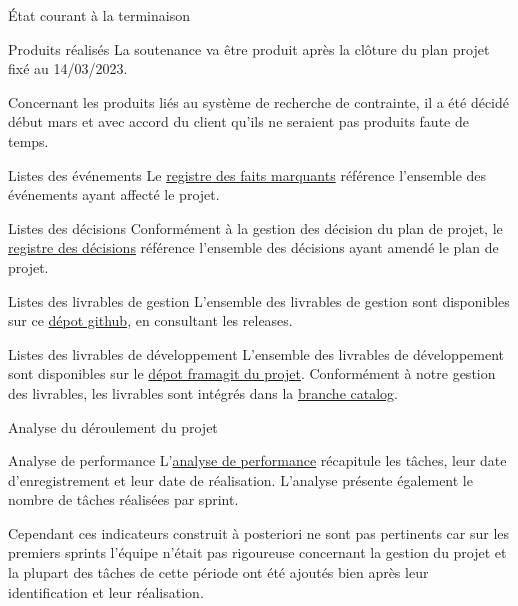\documentclass[]{article}
\begin{document}
{\begin{section}{État courant à la terminaison}
\begin{subsection}{Produits réalisés}
     La soutenance va être produit après la clôture du plan projet fixé au 14/03/2023.

     Concernant les produits liés au système de recherche de contrainte, il a été décidé début mars et avec accord du client qu’ils ne seraient pas produits faute de temps.
 \end{subsection}

 \begin{subsection}{Listes des événements}
     Le \href{Registre_des_faits_marquants.pdf}{registre des faits marquants} référence l'ensemble des événements ayant affecté le projet.
 \end{subsection}

 \begin{subsection}{Listes des décisions}
     Conformément à la gestion des décision du plan de projet, le \href{Registre_des_décisions.pdf}{registre des décisions} référence l'ensemble des décisions ayant amendé le plan de projet.
 \end{subsection}

 \begin{subsection}{Listes des livrables de gestion}
     L'ensemble des livrables de gestion sont disponibles sur ce \href{https://github.com/Szyckaa/UE-PROJET-DOCS-GESTION}{dépot github}, en consultant les releases.
 \end{subsection}

 \newpage

 \begin{subsection}{Listes des livrables de développement}
     L'ensemble des livrables de développement sont disponibles sur le \href{https://framagit.org/flopedt/FlOpEDT}{dépot framagit du projet}. Conformément à notre gestion des livrables, les livrables sont intégrés dans la \href{https://framagit.org/flopedt/FlOpEDT/-/tree/catalog}{branche catalog}.
 \end{subsection}
\end{section}

\begin{section}{Analyse du déroulement du projet}
 \begin{subsection}{Analyse de performance}
     L'\href{Analyse_de_performance.ods}{analyse de performance} récapitule les tâches, leur date d'enregistrement et leur date de réalisation. L'analyse présente également le nombre de tâches réalisées par sprint.

     Cependant ces indicateurs construit à posteriori ne sont pas pertinents car sur les premiers sprints l'équipe n'était pas rigoureuse concernant la gestion du projet et la plupart des tâches de cette période ont été ajoutés bien après leur identification et leur réalisation.


\end{subsection}
\end{section}}
\end{document}
